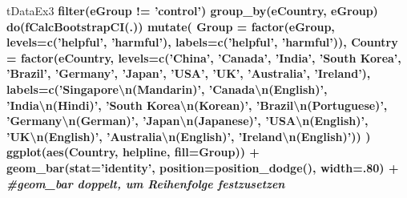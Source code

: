 \documentclass[]{article}
\newenvironment{Shaded}{\begin{snugshade}}{\end{snugshade}}
\newcommand{\CharTok}[1]{\textcolor[rgb]{0.31,0.60,0.02}{#1}}
\newcommand{\CommentTok}[1]{\textcolor[rgb]{0.56,0.35,0.01}{\textit{#1}}}
\newcommand{\DataTypeTok}[1]{\textcolor[rgb]{0.13,0.29,0.53}{#1}}
\newcommand{\DecValTok}[1]{\textcolor[rgb]{0.00,0.00,0.81}{#1}}
\newcommand{\KeywordTok}[1]{\textcolor[rgb]{0.13,0.29,0.53}{\textbf{#1}}}
\newcommand{\NormalTok}[1]{#1}
\newcommand{\OperatorTok}[1]{\textcolor[rgb]{0.81,0.36,0.00}{\textbf{#1}}}
\newcommand{\StringTok}[1]{\textcolor[rgb]{0.31,0.60,0.02}{#1}}
\begin{document}
\begin{Shaded}
\begin{Highlighting}[]
{{{{{{{{{{{{{{{{{{{\NormalTok{tDataEx3 }\OperatorTok{%>%}
\StringTok{  }\KeywordTok{filter}\NormalTok{(eGroup }\OperatorTok{!=}\StringTok{ 'control'}\NormalTok{) }\OperatorTok{%>%}
\StringTok{  }\KeywordTok{group_by}\NormalTok{(eCountry, eGroup) }\OperatorTok{%>%}
\StringTok{  }\KeywordTok{do}\NormalTok{(}\KeywordTok{fCalcBootstrapCI}\NormalTok{(.)) }\OperatorTok{%>%}
\StringTok{  }\KeywordTok{mutate}\NormalTok{(}
    \DataTypeTok{Group =} \KeywordTok{factor}\NormalTok{(eGroup, }
                   \DataTypeTok{levels=}\KeywordTok{c}\NormalTok{(}\StringTok{'helpful'}\NormalTok{, }\StringTok{'harmful'}\NormalTok{),}
                   \DataTypeTok{labels=}\KeywordTok{c}\NormalTok{(}\StringTok{'helpful'}\NormalTok{, }\StringTok{'harmful'}\NormalTok{)),}
    \DataTypeTok{Country =} \KeywordTok{factor}\NormalTok{(eCountry,}
                     \DataTypeTok{levels=}\KeywordTok{c}\NormalTok{(}\StringTok{'China'}\NormalTok{, }\StringTok{'Canada'}\NormalTok{, }\StringTok{'India'}\NormalTok{, }\StringTok{'South Korea'}\NormalTok{, }\StringTok{'Brazil'}\NormalTok{, }\StringTok{'Germany'}\NormalTok{, }\StringTok{'Japan'}\NormalTok{, }\StringTok{'USA'}\NormalTok{, }\StringTok{'UK'}\NormalTok{, }\StringTok{'Australia'}\NormalTok{, }\StringTok{'Ireland'}\NormalTok{),}
                     \DataTypeTok{labels=}\KeywordTok{c}\NormalTok{(}\StringTok{'Singapore}\CharTok{\textbackslash{}n}\StringTok{(Mandarin)'}\NormalTok{, }\StringTok{'Canada}\CharTok{\textbackslash{}n}\StringTok{(English)'}\NormalTok{, }\StringTok{'India}\CharTok{\textbackslash{}n}\StringTok{(Hindi)'}\NormalTok{, }\StringTok{'South Korea}\CharTok{\textbackslash{}n}\StringTok{(Korean)'}\NormalTok{, }\StringTok{'Brazil}\CharTok{\textbackslash{}n}\StringTok{(Portuguese)'}\NormalTok{, }\StringTok{'Germany}\CharTok{\textbackslash{}n}\StringTok{(German)'}\NormalTok{, }\StringTok{'Japan}\CharTok{\textbackslash{}n}\StringTok{(Japanese)'}\NormalTok{, }\StringTok{'USA}\CharTok{\textbackslash{}n}\StringTok{(English)'}\NormalTok{, }\StringTok{'UK}\CharTok{\textbackslash{}n}\StringTok{(English)'}\NormalTok{, }\StringTok{'Australia}\CharTok{\textbackslash{}n}\StringTok{(English)'}\NormalTok{, }\StringTok{'Ireland}\CharTok{\textbackslash{}n}\StringTok{(English)'}\NormalTok{))}
\NormalTok{  ) }\OperatorTok{%>%}
\StringTok{  }\KeywordTok{ggplot}\NormalTok{(}\KeywordTok{aes}\NormalTok{(Country, helpline, }\DataTypeTok{fill=}\NormalTok{Group)) }\OperatorTok{+}
\StringTok{    }\KeywordTok{geom_bar}\NormalTok{(}\DataTypeTok{stat=}\StringTok{'identity'}\NormalTok{, }\DataTypeTok{position=}\KeywordTok{position_dodge}\NormalTok{(), }\DataTypeTok{width=}\NormalTok{.}\DecValTok{80}\NormalTok{) }\OperatorTok{+}\StringTok{ }\CommentTok{#geom_bar doppelt, um Reihenfolge festzusetzen}
}}}}}}}}}}}}}}}}}}}}}}}}
\end{Highlighting}
\end{Shaded}
\end{document}
